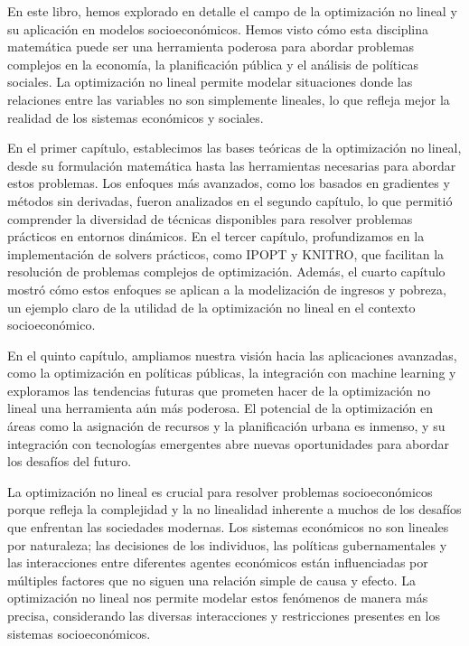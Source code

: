 \begin{flushleft}
	En este libro, hemos explorado en detalle el campo de la optimización no lineal y su aplicación en modelos socioeconómicos. Hemos visto cómo esta disciplina matemática puede ser una herramienta poderosa para abordar problemas complejos en la economía, la planificación pública y el análisis de políticas sociales. La optimización no lineal permite modelar situaciones donde las relaciones entre las variables no son simplemente lineales, lo que refleja mejor la realidad de los sistemas económicos y sociales.
\end{flushleft}

\begin{flushleft}
	En el primer capítulo, establecimos las bases teóricas de la optimización no lineal, desde su formulación matemática hasta las herramientas necesarias para abordar estos problemas. Los enfoques más avanzados, como los basados en gradientes y métodos sin derivadas, fueron analizados en el segundo capítulo, lo que permitió comprender la diversidad de técnicas disponibles para resolver problemas prácticos en entornos dinámicos. En el tercer capítulo, profundizamos en la implementación de solvers prácticos, como IPOPT y KNITRO, que facilitan la resolución de problemas complejos de optimización. Además, el cuarto capítulo mostró cómo estos enfoques se aplican a la modelización de ingresos y pobreza, un ejemplo claro de la utilidad de la optimización no lineal en el contexto socioeconómico.
\end{flushleft}

\begin{flushleft}
	En el quinto capítulo, ampliamos nuestra visión hacia las aplicaciones avanzadas, como la optimización en políticas públicas, la integración con machine learning y exploramos las tendencias futuras que prometen hacer de la optimización no lineal una herramienta aún más poderosa. El potencial de la optimización en áreas como la asignación de recursos y la planificación urbana es inmenso, y su integración con tecnologías emergentes abre nuevas oportunidades para abordar los desafíos del futuro.
\end{flushleft}

\begin{flushleft}
	La optimización no lineal es crucial para resolver problemas socioeconómicos porque refleja la complejidad y la no linealidad inherente a muchos de los desafíos que enfrentan las sociedades modernas. Los sistemas económicos no son lineales por naturaleza; las decisiones de los individuos, las políticas gubernamentales y las interacciones entre diferentes agentes económicos están influenciadas por múltiples factores que no siguen una relación simple de causa y efecto. La optimización no lineal nos permite modelar estos fenómenos de manera más precisa, considerando las diversas interacciones y restricciones presentes en los sistemas socioeconómicos.
\end{flushleft}

